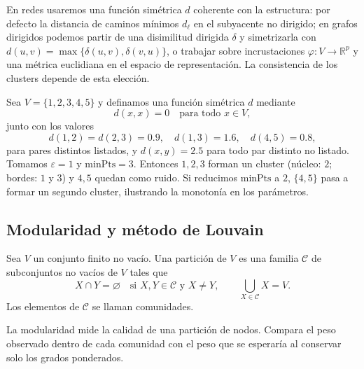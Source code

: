             \begin{observacion}
                En redes usaremos una función simétrica $d$ coherente con la estructura: por defecto la distancia de caminos mínimos $d_\ell$ en el subyacente no dirigido; en grafos dirigidos podemos partir de una disimilitud dirigida $\delta$ y simetrizarla con $d(u,v)=\max\{\delta(u,v),\delta(v,u)\}$, o trabajar sobre incrustaciones $\varphi:V\to\mathbb{R}^p$ y una métrica euclidiana en el espacio de representación. La consistencia de los clusters depende de esta elección.
            \end{observacion}

            \begin{ejemplo}
                Sea $V=\{1,2,3,4,5\}$ y definamos una función simétrica $d$ mediante
                \[
                    d(x,x)=0\quad\text{para todo }x\in V,
                \]
                junto con los valores
                \[
                    d(1,2)=d(2,3)=0.9,\quad d(1,3)=1.6,\quad d(4,5)=0.8,
                \]
                para pares distintos listados, y $d(x,y)=2.5$ para todo par distinto no listado.
                Tomamos $\varepsilon=1$ y $\text{minPts}=3$. Entonces $1,2,3$ forman un cluster (núcleo: $2$; bordes: $1$ y $3$) y $4,5$ quedan como ruido. Si reducimos $\text{minPts}$ a $2$, $\{4,5\}$ pasa a formar un segundo cluster, ilustrando la monotonía en los parámetros.
            \end{ejemplo}


        \subsection{Modularidad y método de Louvain}

            \begin{definicion}[Partición]
                Sea $V$ un conjunto finito no vacío. Una partición de $V$ es una familia $\mathcal{C}$ de subconjuntos no vacíos de $V$ tales que
                \[
                    X\cap Y=\varnothing \quad \text{si } X,Y\in\mathcal{C} \text{ y } X\neq Y,
                    \qquad
                    \bigcup_{X\in\mathcal{C}}X=V.
                \]
                Los elementos de $\mathcal{C}$ se llaman comunidades.
            \end{definicion}

            La modularidad mide la calidad de una partición de nodos. Compara el peso observado dentro de cada comunidad con el peso que se esperaría al conservar solo los grados ponderados.

